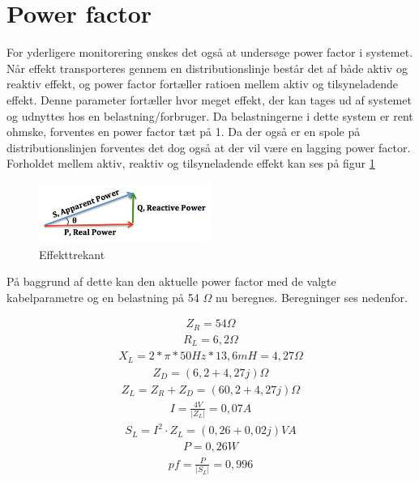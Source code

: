 \section{Power factor}

For yderligere monitorering ønskes det også at undersøge power factor i systemet. Når effekt transporteres gennem en distributionslinje består det af både aktiv og reaktiv effekt, og power factor fortæller ratioen mellem aktiv og tilsyneladende effekt. Denne parameter fortæller hvor meget effekt, der kan tages ud af systemet og udnyttes hos en belastning/forbruger. Da belastningerne i dette system er rent ohmske, forventes en power factor tæt på 1. Da der også er en spole på distributionslinjen forventes det dog også at der vil være en lagging power factor. Forholdet mellem aktiv, reaktiv og tilsyneladende effekt kan ses på figur \ref{fig:Effekttrekant}

\begin{figure}[H] 
	\centering
	\includegraphics[width=0.5\textwidth]{Figure/Effekttrekant}
	\caption{Effekttrekant}
	\label{fig:Effekttrekant}
\end{figure}

På baggrund af dette kan den aktuelle power factor med de valgte kabelparametre og en belastning på 54 $\Omega$ nu beregnes. Beregninger ses nedenfor.

\begin{align}
Z_R=54 \Omega
\end{align}
\begin{align}
R_L=6,2\Omega
\end{align}
\begin{align}
X_L=2*\pi*50Hz*13,6mH=4,27\Omega
\end{align}
\begin{align}
Z_D=(6,2+4,27j)\Omega
\end{align}
\begin{align}
Z_L=Z_R+Z_D=(60,2+4,27j)\Omega
\end{align}
\begin{align}
I=\frac{4V}{\vert Z_L \vert} = 0,07 A
\end{align}
\begin{align}
S_L=I^2\cdot Z_L = (0,26+0,02j) VA
\end{align}
\begin{align}
P=0,26 W
\end{align}
\begin{align}
pf= \frac{P}{\vert S_L \vert} = 0,996
\end{align}

